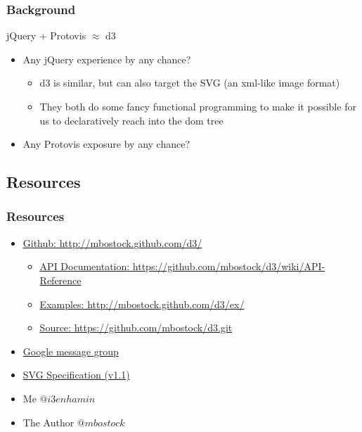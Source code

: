 \documentclass{beamer}
\begin{document}
\begin{frame}
    \frametitle{Background}
    \begin{block}{jQuery $+$ Protovis $\approx$ d3}
\pause
        \begin{itemize}
        \item Any jQuery experience by any chance?
\pause
            \begin{itemize}
            \item d3 is similar, but can also target the SVG (an xml-like image format)
\pause
            \item They both do some fancy functional programming to make it possible 
                  for us to declaratively reach into the dom tree
            \end{itemize}
\pause
       \item Any Protovis exposure by any chance?
       \end{itemize}
    \end{block}
\end{frame}



\subsection{Resources}

\begin{frame}
    \frametitle{Resources}
\pause
        \begin{itemize}
        \item \href{http://mbostock.github.com/d3/}{\underline{Github}: http://mbostock.github.com/d3/}
\pause
            \begin{itemize}
            \item \href{https://github.com/mbostock/d3/wiki/API-Reference}{\underline{API Documentation}: https://github.com/mbostock/d3/wiki/API-Reference}
\pause
            \item \href{http://mbostock.github.com/d3/ex/}{\underline{Examples}: http://mbostock.github.com/d3/ex/}
\pause
            \item \href{https://github.com/mbostock/d3.git}{\underline{Source}: https://github.com/mbostock/d3.git}
            \end{itemize}
\pause
        \item \href{http://groups.google.com/group/d3-js?pli=1}{Google message group}
\pause
        \item \href{http://www.w3.org/TR/SVG/}{SVG Specification (v1.1)}
\pause
        \item Me $@i3enhamin$
        \item The Author $@mbostock$
        \end{itemize}
\end{frame}
\end{document}
